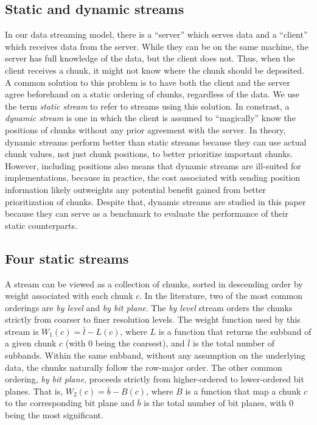 \subsection{Static and dynamic streams}
\label{sec:static-dynamic-streams}

In our data streaming model, there is a ``server'' which serves data and a ``client'' which receives
data from the server. While they can be on the same machine, the server has full knowledge of the
data, but the client does not. Thus, when the client receives a chunk, it might not know where the
chunk should be deposited. A common solution to this problem is to have both the client and the
server agree beforehand on a static ordering of chunks, regardless of the data. We use the term
\emph{static stream} to refer to streams using this solution. In constrast, a \emph{dynamic stream}
is one in which the client is assumed to ``magically'' know the positions of chunks without any
prior agreement with the server. In theory, dynamic streams perform better than static streams
because they can use actual chunk values, not just chunk positions, to better prioritize important
chunks. However, including positions also means that dynamic streams are ill-suited for implementations, because in
practice, the cost associated with sending position information likely outweights any potential
benefit gained from better prioritization of chunks. Despite that, dynamic streams are studied in
this paper because they can serve as a benchmark to evaluate the performance of their static
counterparts.

\subsection{Four static streams}
\label{sec:common-static-streams}

A stream can be viewed as a collection of chunks, sorted in descending order by weight
associated with each chunk $c$. In the literature, two of the most common orderings are \emph{by
level} and \emph{by bit plane}. The \emph{by level} stream orders the chunks strictly from coarser
to finer resolution levels. The weight function used by this stream is $W_1(c)=\bar{l}-L(c)$, where
$L$ is a function that returns the subband of a given chunk $c$ (with $0$ being the coarsest), and
$\bar{l}$ is the total number of subbands. Within the same subband, without any assumption on the
underlying data, the chunks naturally follow the row-major order. The other common ordering,
\emph{by bit plane}, proceeds strictly from higher-ordered to lower-ordered bit planes. That is,
$W_2(c)=\bar{b}-B(c)$, where $B$ is a function that map a chunk $c$ to the corresponding bit plane
and $\bar{b}$ is the total number of bit planes, with $0$ being the most significant.

